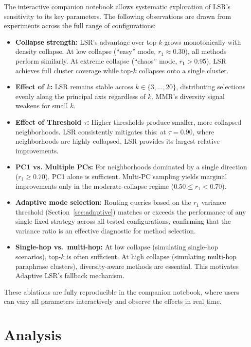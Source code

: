 \documentclass{article}
\begin{document}
The interactive companion notebook allows systematic exploration of LSR's sensitivity to its key parameters. The following observations are drawn from experiments across the full range of configurations:
\begin{itemize}
    \item \textbf{Collapse strength:} LSR's advantage over top-$k$ grows monotonically with density collapse. At low collapse (``easy'' mode, $r_1 \approx 0.30$), all methods perform similarly. At extreme collapse (``chaos'' mode, $r_1 > 0.95$), LSR achieves full cluster coverage while top-$k$ collapses onto a single cluster.
    \item \textbf{Effect of $k$:} LSR remains stable across $k \in \{3, \ldots, 20\}$, distributing selections evenly along the principal axis regardless of $k$. MMR's diversity signal weakens for small $k$.
    \item \textbf{Effect of Threshold $\tau$:} Higher thresholds produce smaller, more collapsed neighborhoods. LSR consistently mitigates this: at $\tau = 0.90$, where neighborhoods are highly collapsed, LSR provides its largest relative improvements.
    \item \textbf{PC1 vs. Multiple PCs:} For neighborhoods dominated by a single direction ($r_1 \geq 0.70$), PC1 alone is sufficient. Multi-PC sampling yields marginal improvements only in the moderate-collapse regime ($0.50 \leq r_1 < 0.70$).
    \item \textbf{Adaptive mode selection:} Routing queries based on the $r_1$ variance threshold (Section~\ref{sec:adaptive}) matches or exceeds the performance of any single fixed strategy across all tested configurations, confirming that the variance ratio is an effective diagnostic for method selection.
    \item \textbf{Single-hop vs.\ multi-hop:} At low collapse (simulating single-hop scenarios), top-$k$ is often sufficient. At high collapse (simulating multi-hop paraphrase clusters), diversity-aware methods are essential. This motivates Adaptive LSR's fallback mechanism.
\end{itemize}

These ablations are fully reproducible in the companion notebook, where users can vary all parameters interactively and observe the effects in real time.


\section{Analysis}
\end{document}
